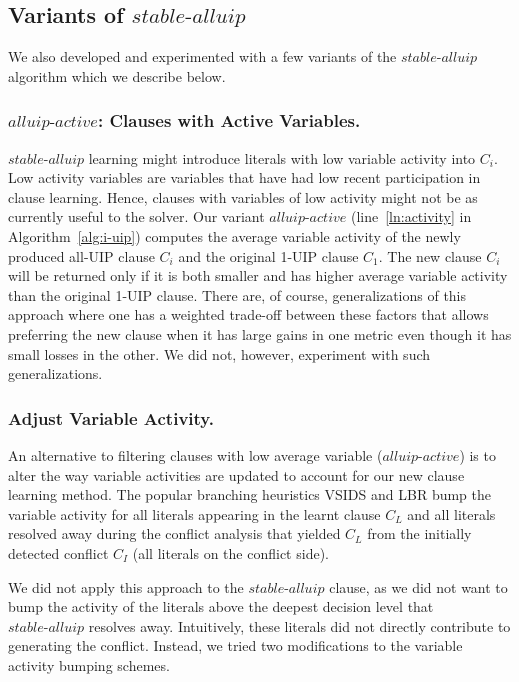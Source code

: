 \documentclass[runningheads]{llncs}
\newcommand{\oneuip}{1-UIP\xspace}
\newcommand{\alluip}{all-UIP\xspace}
\newcommand{\stablealluip}{\textit{stable-alluip}\xspace}
\newcommand{\allUipAct}{\textit{alluip-active}}
\begin{document}
\subsection{Variants of $\stablealluip$}
We also developed and experimented with a few variants of the
$\stablealluip$ algorithm which we describe below.

\subsubsection{$\allUipAct$: Clauses with Active Variables.}
\label{sec:active} $\stablealluip$ learning might introduce literals
with low variable activity into $C_i$. Low activity variables are
variables that have had low recent participation in clause
learning. Hence, clauses with variables of low activity might not be
as currently useful to the solver. Our variant $\allUipAct$
(line~\ref{ln:activity} in Algorithm~\ref{alg:i-uip}) computes the
average variable activity of the newly produced \alluip clause $C_i$
and the original \oneuip clause $C_1$. The new clause $C_i$ will be
returned only if it is both smaller and has higher average variable
activity than the original \oneuip clause. There are, of course,
generalizations of this approach where one has a weighted trade-off
between these factors that allows preferring the new clause when it
has large gains in one metric even though it has small losses in the
other. We did not, however, experiment with such generalizations.

\subsubsection{Adjust Variable Activity.}
\label{sec: varajust} An alternative to filtering clauses with low
average variable ($\allUipAct$) is to alter the way variable
activities are updated to account for our new clause learning
method. The popular branching heuristics VSIDS
\cite{DBLP:conf/dac/MoskewiczMZZM01} and LBR
\cite{DBLP:conf/sat/LiangGPC16} bump the variable activity for all
literals appearing in the learnt clause $C_L$ and all literals
resolved away during the conflict analysis that yielded $C_L$ from the
initially detected conflict $C_I$ (all literals on the conflict side).

We did not apply this approach to the $\stablealluip$ clause, as we did not
want to bump the activity of the literals above the deepest decision
level that $\stablealluip$ resolves away. Intuitively, these literals did
not directly contribute to generating the conflict. Instead, we tried
two modifications to the variable activity bumping schemes.
\end{document}
